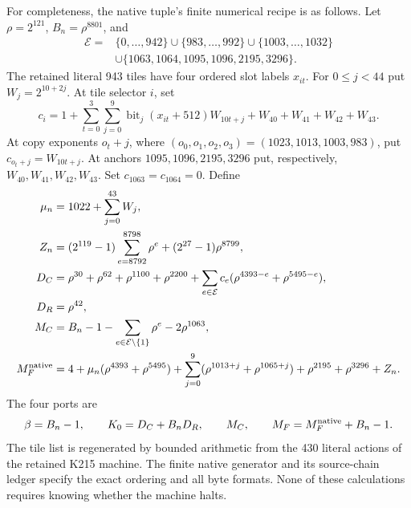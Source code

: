 \documentclass[11pt,a4paper]{article}
\theoremstyle{definition}\newtheorem{definition}[theorem]{Definition}
\theoremstyle{remark}\newtheorem{remark}[theorem]{Remark}
\begin{document}
For completeness, the native tuple's finite numerical recipe is as follows.
Let $\rho=2^{121}$, $B_n=\rho^{8801}$, and
\begin{align*}
 \mathcal E={}&\{0,\ldots,942\}\cup\{983,\ldots,992\}
 \cup\{1003,\ldots,1032\}\\
 &\cup\{1063,1064,1095,1096,2195,3296\}.
\end{align*}
The retained literal 943 tiles have four ordered slot labels $x_{it}$.
For $0\le j<44$ put $W_j=2^{10+2j}$. At tile selector $i$, set
\[
 c_i=1+\sum_{t=0}^3\sum_{j=0}^9
 \operatorname{bit}_j(x_{it}+512)W_{10t+j}
 +W_{40}+W_{41}+W_{42}+W_{43}.
\]
At copy exponents $o_t+j$, where $(o_0,o_1,o_2,o_3)=(1023,1013,1003,983)$,
put $c_{o_t+j}=W_{10t+j}$. At anchors $1095,1096,2195,3296$ put,
respectively, $W_{40},W_{41},W_{42},W_{43}$. Set $c_{1063}=c_{1064}=0$.
Define
\begin{align*}
 \mu_n&=1022+\sum_{j=0}^{43}W_j,\\
 Z_n&=(2^{119}-1)\sum_{e=8792}^{8798}\rho^e+(2^{27}-1)\rho^{8799},\\
 D_C&=\rho^{30}+\rho^{62}+\rho^{1100}+\rho^{2200}
       +\sum_{e\in\mathcal E}c_e(\rho^{4393-e}+\rho^{5495-e}),\\
 D_R&=\rho^{42},\\
 M_C&=B_n-1-\sum_{e\in\mathcal E\setminus\{1\}}\rho^e-2\rho^{1063},\\
 M_F^{\rm native}&=4+\mu_n(\rho^{4393}+\rho^{5495})
   +\sum_{j=0}^{9}(\rho^{1013+j}+\rho^{1065+j})+\rho^{2195}+\rho^{3296}+Z_n.
\end{align*}
The four ports are
\[
 \beta=B_n-1,\qquad K_0=D_C+B_nD_R,\qquad
 M_C,\qquad M_F=M_F^{\rm native}+B_n-1.
\]
The tile list is regenerated by bounded arithmetic from the 430 literal
actions of the retained K215 machine. The finite native generator and its
source-chain ledger specify the exact ordering and all byte formats.
None of these calculations requires knowing whether the machine halts.
\end{document}
